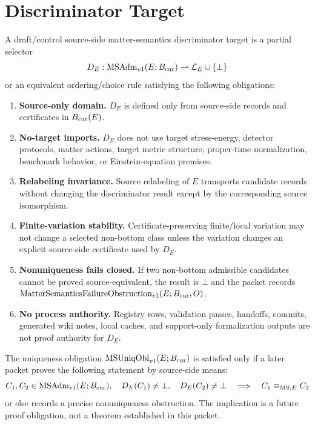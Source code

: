 \section{Discriminator Target}

\begin{definition}
A draft/control source-side matter-semantics discriminator target is a partial
selector
\[
  D_E:\mathrm{MSAdm}_{v1}(E;B_{\mathrm{cur}})\rightharpoonup \mathcal{L}_E \cup \{\bot\}
\]
or an equivalent ordering/choice rule satisfying the following obligations:
\begin{enumerate}
  \item \textbf{Source-only domain.} \(D_E\) is defined only from source-side
    records and certificates in \(B_{\mathrm{cur}}(E)\).
  \item \textbf{No-target imports.} \(D_E\) does not use target
    stress-energy, detector protocols, matter actions, target metric
    structure, proper-time normalization, benchmark behavior, or
    Einstein-equation premises.
  \item \textbf{Relabeling invariance.} Source relabeling of \(E\) transports
    candidate records without changing the discriminator result except by the
    corresponding source isomorphism.
  \item \textbf{Finite-variation stability.} Certificate-preserving
    finite/local variation may not change a selected non-bottom class unless
    the variation changes an explicit source-side certificate used by \(D_E\).
  \item \textbf{Nonuniqueness fails closed.} If two non-bottom admissible
    candidates cannot be proved source-equivalent, the result is \(\bot\) and
    the packet records \(\mathrm{MatterSemanticsFailureObstruction}_{v1}(E;B_{\mathrm{cur}},O)\).
  \item \textbf{No process authority.} Registry rows, validation passes,
    handoffs, commits, generated wiki notes, local caches, and support-only
    formalization outputs are not proof authority for \(D_E\).
\end{enumerate}
\end{definition}

\begin{definition}
The uniqueness obligation \(\mathrm{MSUniqObl}_{v1}(E;B_{\mathrm{cur}})\) is satisfied only if a later
packet proves the following statement by source-side means:
\[
  C_1,C_2\in\mathrm{MSAdm}_{v1}(E;B_{\mathrm{cur}}),\quad
  D_E(C_1)\ne\bot,\quad D_E(C_2)\ne\bot
  \quad\Longrightarrow\quad C_1 \equiv_{\mathrm{MS},E} C_2
\]
or else records a precise nonuniqueness obstruction.  The implication is a
future proof obligation, not a theorem established in this packet.
\end{definition}

